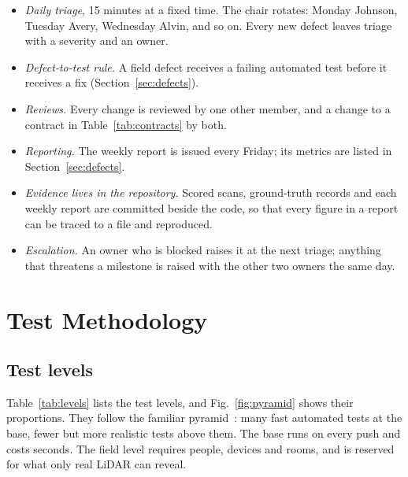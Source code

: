 \documentclass[conference,a4paper,10pt]{IEEEtran}
\begin{document}
\begin{itemize}
\item \emph{Daily triage}, 15 minutes at a fixed time. The chair rotates:
  Monday Johnson, Tuesday Avery, Wednesday Alvin, and so on. Every new defect
  leaves triage with a severity and an owner.
\item \emph{Defect-to-test rule.} A field defect receives a failing automated
  test before it receives a fix (Section~\ref{sec:defects}).
\item \emph{Reviews.} Every change is reviewed by one other member, and a
  change to a contract in Table~\ref{tab:contracts} by both.
\item \emph{Reporting.} The weekly report is issued every Friday; its
  metrics are listed in Section~\ref{sec:defects}.
\item \emph{Evidence lives in the repository.} Scored scans, ground-truth
  records and each weekly report are committed beside the code, so that every
  figure in a report can be traced to a file and reproduced.
\item \emph{Escalation.} An owner who is blocked raises it at the next
  triage; anything that threatens a milestone is raised with the other two
  owners the same day.
\end{itemize}

\section{Test Methodology}\label{sec:method}

\subsection{Test levels}

Table~\ref{tab:levels} lists the test levels, and Fig.~\ref{fig:pyramid}
shows their proportions. They follow the familiar
pyramid~\cite{cohn}: many fast automated tests at the base, fewer but more
realistic tests above them. The base runs on every push and costs seconds.
The field level requires people, devices and rooms, and is reserved for what
only real LiDAR can reveal.
\end{document}
